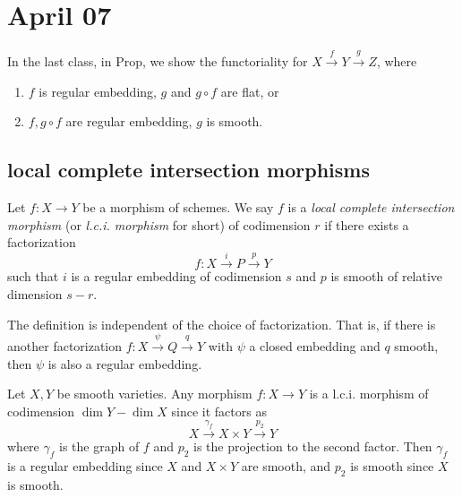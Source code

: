 \section{April 07}

  In the last class, in Prop, we show the functoriality for $X \xrightarrow{f} Y \xrightarrow{g} Z$, 
  where
  \begin{enumerate}
    \item $f$ is regular embedding, $g$ and $g \circ f$ are flat, or
    \item $f, g\circ f$ are regular embedding, $g$ is smooth.
  \end{enumerate}


\subsection{local complete intersection morphisms}

  \begin{definition}
    Let $f: X \to Y$ be a morphism of schemes. 
    We say $f$ is a \emph{local complete intersection morphism} (or \emph{l.c.i. morphism} for short) of codimension $r$ if there exists a factorization
    \[
      f: X \xrightarrow{i} P \xrightarrow{p} Y
    \]
    such that $i$ is a regular embedding of codimension $s$ and $p$ is smooth of relative dimension $s-r$.\Yang{}
  \end{definition}

  The definition is independent of the choice of factorization.
  That is, if there is another factorization $f: X \xrightarrow{\psi} Q \xrightarrow{q} Y$ with $\psi$ a closed embedding and $q$ smooth, then $\psi$ is also a regular embedding.


  \begin{example}
    Let $X,Y$ be smooth varieties.
    Any morphism $f: X \to Y$ is a l.c.i. morphism of codimension $\dim Y - \dim X$ since it factors as
    \[
      X \xrightarrow{\gamma_f} X \times Y \xrightarrow{p_2} Y
    \]
    where $\gamma_f$ is the graph of $f$ and $p_2$ is the projection to the second factor.
    Then $\gamma_f$ is a regular embedding since $X$ and $X \times Y$ are smooth, and $p_2$ is smooth since $X$ is smooth.
  \end{example}

